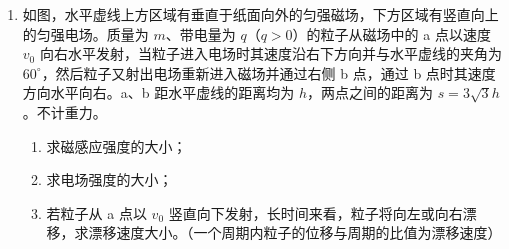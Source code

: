 \documentclass[\gkver]{gaokaozhenti}
\begin{document}
\begin{enumerate}
{则物块 P 在第一个防滑带上运动的时间为 $t_{1} = 0.4 \Us$

物块 P 在光滑的直道上做匀速直线运动，则 $l_{1} = v_{P1}t_{2}$

解得 $t_{2} = 0.6 \Us$

物块 P 在第二个防滑带上运动时，由运动学公式 $v_{P1}^{2} - v_{P2}^{2} = 2al_{2}$，$v_{P2} = v_{P1} - at_{3}$

解得 $v_{P2} = 1 \Ums$

则物块 P 在第二个防滑带上运动的时间为 $t_{3} = 0.8 \Us$

物块 P 在光滑的直道上做匀速直线运动，则 $l_{1} = v_{P2}t_{4}$

解得 $t_{4} = 3 \Us$

由以上条件可知，物块 P 最终停在第三个防滑带上，由运动学公式 $0 = v_{P2} - at_{5}$

可得物块 P 在第三个防滑带上运动的时间为 $t_{5} = 0.2 \Us$

故物块 P 从开始运动到静止经历的时间为 $t = t_{1} + t_{2} + t_{3} + t_{4} + t_{5} = 5 \Us$
}

\item
如图，水平虚线上方区域有垂直于纸面向外的匀强磁场，下方区域有竖直向上的匀强电场。质量为 $m$、带电量为 $q$（$q > 0$）的粒子从磁场中的 a 点以速度 $v_{0}$ 向右水平发射，当粒子进入电场时其速度沿右下方向并与水平虚线的夹角为 $60^\circ$，然后粒子又射出电场重新进入磁场并通过右侧 b 点，通过 b 点时其速度方向水平向右。a、b 距水平虚线的距离均为 $h$，两点之间的距离为 $s = 3\sqrt{3}h$。不计重力。

\begin{enumerate}
	\item
	求磁感应强度的大小；
	\item
	求电场强度的大小；
	\item
	若粒子从 a 点以 $v_{0}$ 竖直向下发射，长时间来看，粒子将向左或向右漂移，求漂移速度大小。（一个周期内粒子的位移与周期的比值为漂移速度）
\end{enumerate}


\end{enumerate}
\end{document}
